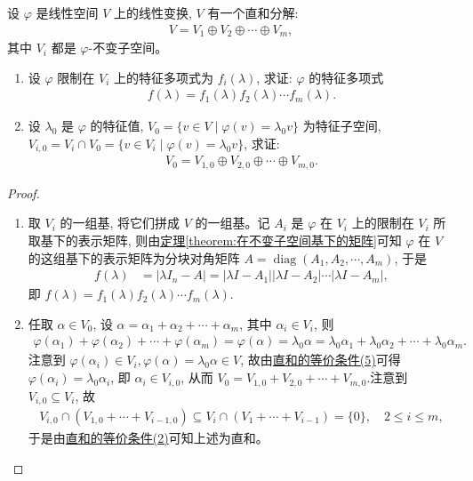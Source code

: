 \documentclass[../../main.tex]{subfiles}%
\begin{document}
\begin{proposition}\label{proposition:线性变换不变子空间直和分解与特征值的关系}
设 $\varphi$ 是线性空间 $V$ 上的线性变换, $V$ 有一个直和分解:
\begin{align*}
V = V_1 \oplus V_2 \oplus \cdots \oplus V_m,
\end{align*}
其中 $V_i$ 都是 $\varphi$-不变子空间。
\begin{enumerate}[(1)]
\item 设 $\varphi$ 限制在 $V_i$ 上的特征多项式为 $f_i(\lambda)$, 求证: $\varphi$ 的特征多项式
\begin{align*}
f(\lambda) = f_1(\lambda) f_2(\lambda) \cdots f_m(\lambda).
\end{align*}

\item  设 $\lambda_0$ 是 $\varphi$ 的特征值, $V_0 = \{v \in V \mid \varphi(v) = \lambda_0 v\}$ 为特征子空间, $V_{i,0} = V_i \cap V_0 = \{v \in V_i \mid \varphi(v) = \lambda_0 v\}$, 求证:
\begin{align*}
V_0 = V_{1,0} \oplus V_{2,0} \oplus \cdots \oplus V_{m,0}.
\end{align*}
\end{enumerate}
\end{proposition}
\begin{proof}
\begin{enumerate}[(1)]
\item  取 $V_i$ 的一组基, 将它们拼成 $V$ 的一组基。记 $A_i$ 是 $\varphi$ 在 $V_i$ 上的限制在 $V_i$ 所取基下的表示矩阵, 则由\hyperref[theorem:在不变子空间基下的矩阵]{定理\ref{theorem:在不变子空间基下的矩阵}}可知 $\varphi$ 在 $V$ 的这组基下的表示矩阵为分块对角矩阵 $A = \operatorname{diag}(A_1, A_2, \cdots, A_m)$, 于是
\begin{align*}
f(\lambda) &= |\lambda I_n - A| = |\lambda I - A_1| |\lambda I - A_2| \cdots |\lambda I - A_m|,
\end{align*}
即 $f(\lambda) = f_1(\lambda) f_2(\lambda) \cdots f_m(\lambda)$.

\item 任取 $\alpha \in V_0$, 设 $\alpha = \alpha_1 + \alpha_2 + \cdots + \alpha_m$, 其中 $\alpha_i \in V_i$, 则
\begin{align*}
\varphi(\alpha_1) + \varphi(\alpha_2) + \cdots + \varphi(\alpha_m) = \varphi(\alpha) = \lambda_0 \alpha = \lambda_0 \alpha_1 + \lambda_0 \alpha_2 + \cdots + \lambda_0 \alpha_m.
\end{align*}
注意到 $\varphi(\alpha_i) \in V_i,\varphi(\alpha) = \lambda_0 \alpha\in V$, 故由\hyperref[theorem:直和的等价条件]{直和的等价条件(5)}可得 $\varphi(\alpha_i) = \lambda_0 \alpha_i$, 即 $\alpha_i \in V_{i,0}$, 从而 $V_0=V_{1,0}+V_{2,0}+\cdots +V_{m,0}$.注意到 $V_{i,0} \subseteq V_i$, 故
\begin{align*}
V_{i,0} \cap (V_{1,0} + \cdots + V_{i-1,0}) \subseteq V_i \cap (V_1 + \cdots + V_{i-1}) = \{0\}, \quad 2 \leqslant  i \leqslant  m,
\end{align*}
于是由\hyperref[theorem:直和的等价条件]{直和的等价条件(2)}可知上述为直和。
\end{enumerate}

\end{proof}
\end{document}
